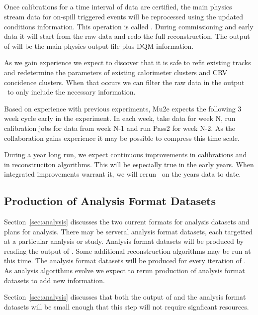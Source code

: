 \subsection{\passtwo}
\label{ssec:pass2}

Once calibrations for a time interval of data are certified, the main physics stream data for on-spill triggered events will be reprocessed using the updated conditions information. This operation is called \passtwo.
During commissioning and early data it will start from the raw data and redo the full reconstruction.
The output of \passtwo will be the main physics output file plus DQM information.

As we gain experience we expect to discover that it is safe to refit existing tracks
and redetermine the parameters of existing calorimeter clusters and CRV concidence clusters.
When that occurs we can filter the raw data in the output \passone\ to only include
the necessary information.

Based on experience with previous experiments,  Mu2e expects the following 3 week cycle early in the experiment.
In each week, take data for week N, run calibration jobs for data from week N-1 and run Pass2 for week N-2.
As the collaboration gains experience it may be possible to compress this time scale.

During a year long run, we expect continuous improvements in calibrations and in reconstruciton algorithms.
This will be especially true in the early years.
When integrated improvements warrant it, we will rerun \passtwo\ on the years data to date.

\subsection{Production of Analysis Format Datasets}
\label{ssec:ntupling}

Section~\ref{sec:analysis} discusses the two current formats for analysis datasets and plans for analysis.
There may be serveral analysis format datasets, each targetted at a particular analysis or study.
Analysis format datasets will be produced by reading the output of \passtwo.
Some additional reconstruction algorithms may be run at this time.  The analysis format datasets will be produced for every iteration of \passtwo.  
As analysis algorithms evolve we expect to rerun production of analysis format datasets to add new information.

Section~\ref{sec:analysis} discusses that both the output of \passtwo and the analysis format datasets will be small enough that this step will not require signficant resources.

